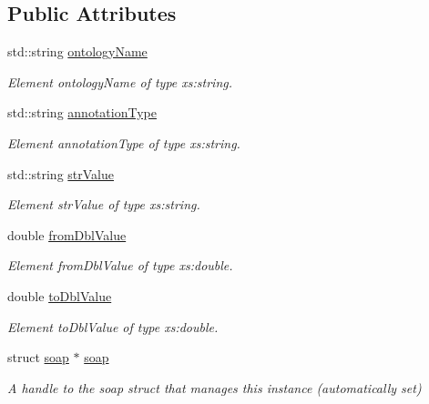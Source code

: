 \subsection*{Public Attributes}
\begin{DoxyCompactItemize}
\item 
std::string \hyperlink{class__ns1____getTermsByAnnotationData_ae0b0ef37498c1e3352dec46c42f1a96c}{ontologyName}
\begin{DoxyCompactList}\small\item\em Element ontologyName of type xs:string. \end{DoxyCompactList}\item 
std::string \hyperlink{class__ns1____getTermsByAnnotationData_a12d3190db3888b729c34fba403a935f5}{annotationType}
\begin{DoxyCompactList}\small\item\em Element annotationType of type xs:string. \end{DoxyCompactList}\item 
std::string \hyperlink{class__ns1____getTermsByAnnotationData_aa431f2c0230ee32aad7be95da74c7efd}{strValue}
\begin{DoxyCompactList}\small\item\em Element strValue of type xs:string. \end{DoxyCompactList}\item 
double \hyperlink{class__ns1____getTermsByAnnotationData_a3faa41808f1e36e368cee752b56ffba8}{fromDblValue}
\begin{DoxyCompactList}\small\item\em Element fromDblValue of type xs:double. \end{DoxyCompactList}\item 
double \hyperlink{class__ns1____getTermsByAnnotationData_a261ea73865928f6d1925fb43d07817e4}{toDblValue}
\begin{DoxyCompactList}\small\item\em Element toDblValue of type xs:double. \end{DoxyCompactList}\item 
\hypertarget{class__ns1____getTermsByAnnotationData_a272b2d34d4520dc94f7180d32600706b}{
struct \hyperlink{class__ns1____getTermsByAnnotationData_a272b2d34d4520dc94f7180d32600706b}{soap} $\ast$ \hyperlink{class__ns1____getTermsByAnnotationData_a272b2d34d4520dc94f7180d32600706b}{soap}}
\label{class__ns1____getTermsByAnnotationData_a272b2d34d4520dc94f7180d32600706b}

\begin{DoxyCompactList}\small\item\em A handle to the soap struct that manages this instance (automatically set) \end{DoxyCompactList}\end{DoxyCompactItemize}


